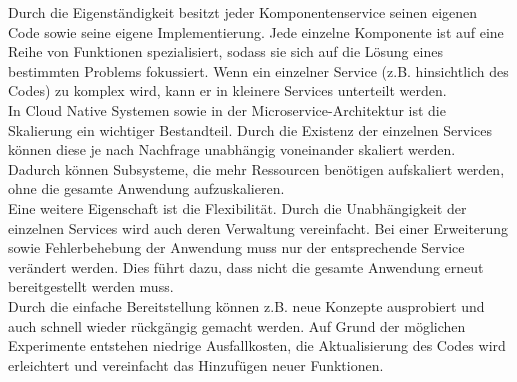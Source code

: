 Durch die Eigenständigkeit besitzt jeder Komponentenservice seinen eigenen Code sowie seine eigene Implementierung. Jede einzelne Komponente ist auf eine Reihe von Funktionen spezialisiert, sodass sie sich auf die Lösung eines bestimmten Problems fokussiert. Wenn ein einzelner Service (z.B. hinsichtlich des Codes) zu komplex wird, kann er in kleinere Services unterteilt werden.\\
In Cloud Native Systemen sowie in der Microservice-Architektur ist die Skalierung ein wichtiger Bestandteil. Durch die Existenz der einzelnen Services können diese je nach Nachfrage unabhängig voneinander skaliert werden. Dadurch können Subsysteme, die mehr Ressourcen benötigen aufskaliert werden, ohne die gesamte Anwendung aufzuskalieren.\\
Eine weitere Eigenschaft ist die Flexibilität. Durch die Unabhängigkeit der einzelnen Services wird auch deren Verwaltung vereinfacht. Bei einer Erweiterung sowie Fehlerbehebung der Anwendung muss nur der entsprechende Service verändert werden. Dies führt dazu, dass nicht die gesamte Anwendung erneut bereitgestellt werden muss.\\
Durch die einfache Bereitstellung können z.B. neue Konzepte ausprobiert und auch schnell wieder rückgängig gemacht werden. Auf Grund der möglichen Experimente entstehen niedrige Ausfallkosten, die Aktualisierung des Codes wird erleichtert und vereinfacht das Hinzufügen neuer Funktionen.
\\

